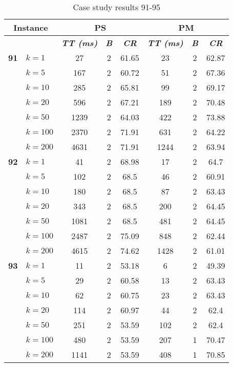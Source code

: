     \begin{table}[htbp]
    \caption{Case study results 91-95}
    \centering
    \begin{tabular}{|l|l|c|c|c|c|c|c|}
    \hline
    \multicolumn{ 2}{|c|}{\textbf{Instance}} & \multicolumn{ 3}{c|}{\textbf{PS}} & \multicolumn{ 3}{c|}{\textbf{PM}} \\ \hline
    \multicolumn{ 2}{|l|}{} & \textbf{\textit{TT (ms)}} & \textbf{\textit{B}} & \textbf{\textit{CR}} & \textbf{\textit{TT (ms)}} & \textbf{\textit{B}} & \textbf{\textit{CR}} \\ \hline
    \multicolumn{1}{|r|}{\textbf{91}} & $k=1$ & 27 & 2 & 61.65 & 23 & 2 & 62.87 \\ 
     & $k=5$ & 167 & 2 & 60.72 & 51 & 2 & 67.36 \\ 
     & $k=10$ & 285 & 2 & 65.81 & 99 & 2 & 69.17 \\ 
     & $k=20$ & 596 & 2 & 67.21 & 189 & 2 & 70.48 \\ 
     & $k=50$ & 1239 & 2 & 64.03 & 422 & 2 & 73.88 \\ 
     & $k=100$ & 2370 & 2 & 71.91 & 631 & 2 & 64.22 \\ 
     & $k=200$ & 4631 & 2 & 71.91 & 1244 & 2 & 63.94 \\ \hline
    \multicolumn{1}{|r|}{\textbf{92}} & $k=1$ & 41 & 2 & 68.98 & 17 & 2 & 64.7 \\ 
     & $k=5$ & 102 & 2 & 68.5 & 46 & 2 & 60.91 \\ 
     & $k=10$ & 180 & 2 & 68.5 & 87 & 2 & 63.43 \\ 
     & $k=20$ & 343 & 2 & 68.5 & 200 & 2 & 64.45 \\ 
     & $k=50$ & 1081 & 2 & 68.5 & 481 & 2 & 64.45 \\ 
     & $k=100$ & 2487 & 2 & 75.09 & 848 & 2 & 62.44 \\ 
     & $k=200$ & 4615 & 2 & 74.62 & 1428 & 2 & 61.01 \\ \hline
    \multicolumn{1}{|r|}{\textbf{93}} & $k=1$ & 11 & 2 & 53.18 & 6 & 2 & 49.39 \\ 
     & $k=5$ & 29 & 2 & 60.58 & 13 & 2 & 63.43 \\ 
     & $k=10$ & 62 & 2 & 60.75 & 23 & 2 & 63.43 \\ 
     & $k=20$ & 114 & 2 & 60.97 & 44 & 2 & 62.4 \\ 
     & $k=50$ & 251 & 2 & 53.59 & 102 & 2 & 62.4 \\ 
     & $k=100$ & 480 & 2 & 53.59 & 207 & 1 & 70.47 \\ 
     & $k=200$ & 1141 & 2 & 53.59 & 408 & 1 & 70.85 \\ \hline

\end{tabular}
\end{table}
